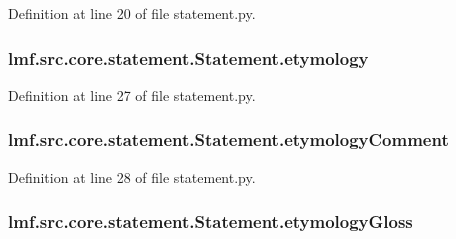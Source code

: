 Definition at line 20 of file statement.\+py.

\hypertarget{classlmf_1_1src_1_1core_1_1statement_1_1_statement_a1232c0098a52fa5f72d6a80c8661152a}{
\subsubsection[{etymology}]{\setlength{\rightskip}{0pt plus 5cm}lmf.\+src.\+core.\+statement.\+Statement.\+etymology}}\label{classlmf_1_1src_1_1core_1_1statement_1_1_statement_a1232c0098a52fa5f72d6a80c8661152a}


Definition at line 27 of file statement.\+py.

\hypertarget{classlmf_1_1src_1_1core_1_1statement_1_1_statement_a25f9127cf2fe1017c53a3ccb57570352}{
\subsubsection[{etymology\+Comment}]{\setlength{\rightskip}{0pt plus 5cm}lmf.\+src.\+core.\+statement.\+Statement.\+etymology\+Comment}}\label{classlmf_1_1src_1_1core_1_1statement_1_1_statement_a25f9127cf2fe1017c53a3ccb57570352}


Definition at line 28 of file statement.\+py.

\hypertarget{classlmf_1_1src_1_1core_1_1statement_1_1_statement_a7d9d96cae746848b83b4ae8516c92bee}{
\subsubsection[{etymology\+Gloss}]{\setlength{\rightskip}{0pt plus 5cm}lmf.\+src.\+core.\+statement.\+Statement.\+etymology\+Gloss}}\label{classlmf_1_1src_1_1core_1_1statement_1_1_statement_a7d9d96cae746848b83b4ae8516c92bee}


